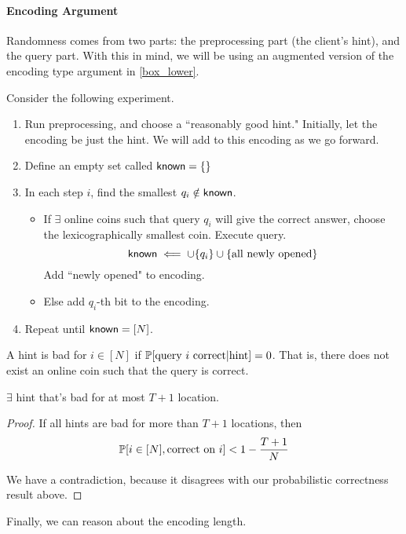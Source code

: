 \paragraph{Encoding Argument}
Randomness comes from two parts: the preprocessing part (the client's hint), and the query part. With this in mind, we will be using an augmented version of the encoding type argument in \ref{box_lower}.

Consider the following experiment.
\begin{enumerate}
    \item Run preprocessing, and choose a ``reasonably good hint." Initially, let the encoding be just the hint. We will add to this encoding as we go forward.
    \item Define an empty set called ${\sf known} = \{\}$
    \item In each step $i$, find the smallest $q_i \notin {\sf known}$. 
    \begin{itemize}
        \item If $\exists$ online coins such that query $q_i$ will give the correct answer, choose the lexicographically smallest coin. Execute query.
        \[{\sf known} \impliedby \cup \{q_i\} \cup \{\text{all newly opened}\}\]
        Add ``newly opened" to encoding.
        \item Else add $q_i$-th bit to the encoding.
    \end{itemize}
    \item Repeat until ${\sf known} = [N]$.
    
\end{enumerate}

A hint is bad for $i \in [N]$ if $\mathbb{P}[\text{query $i$ correct} | \text{hint}] = 0$. That is, there does not exist an online coin such that the query is correct.

\begin{claim}
    $\exists$ hint that's bad for at most $T + 1$ location.
\end{claim}
\begin{proof}
    If all hints are bad for  more than $T+1$ locations, then
    \[\mathbb{P}[i \in [N], \text{correct on $i$}] < 1 - \frac{T+1}{N}\]

    We have a contradiction, because it disagrees with our probabilistic correctness result above.
\end{proof}

Finally, we can reason about the encoding length. 

